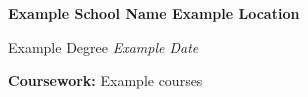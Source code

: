 \textbf{Example School Name \hfill Example Location} \par
Example Degree \hfill \textit{Example Date}\par
\textbf{Coursework:} Example courses
